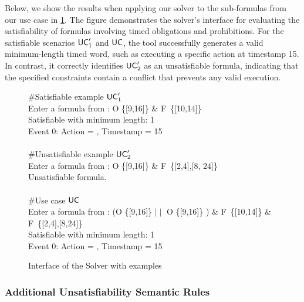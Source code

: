 \begin{example}\label{satsolver}
    Below, we show the results when applying our solver to the  sub-formulas from our use case in \ref{ex:interface}. The figure demonstrates the solver's interface for evaluating the satisfiability of \TDDLfm formulas involving timed obligations and prohibitions. For the satisfiable scenarios $\mathsf{UC}_1'$ and $\mathsf{UC}$, the tool successfully generates a valid minimum-length timed word, such as executing a specific action at timestamp 15. In contrast, it correctly identifies $\mathsf{UC}_2'$ as an unsatisfiable formula, indicating that the specified constraints contain a conflict that prevents any valid execution.
    \begin{figure}[htb]
    \begin{tcolorbox}[colback=blue!10, colframe=gray!80, title=Solver Examples]
    \#Satisfiable example $\mathsf{UC}_1'$\\
        Enter a formula from \TDDLfm: O \delAtGate \{[9,16]\} \& F~\delAtGate \{[10,14]\}\\
        Satisfiable \timedword with minimum length: 1\\
        Event 0: Action = \delAtGate, Timestamp = 15\\
        \\
    \#Unsatisfiable example $\mathsf{UC}_2'$\\
        Enter a formula from \TDDLfm: O \delAtGate \{[9,16]\} \& F~\delAtPark \{[2,4],[8, $24$]\}\\
        Unsatisfiable formula.\\\\
    \#Use case $\mathsf{UC}$\\
     Enter a formula from \TDDLfm: (O \delAtGate \{[9,16]\} $\mid\mid$ O \delAtPark \{[9,16]\} ) \& F~\delAtGate \{[10,14]\} \& F~\delAtGate \{[2,4],[8,24]\}\\
        Satisfiable \timedword with minimum length: 1\\
        Event 0: Action = \delAtGate, Timestamp = 15
    \end{tcolorbox}
    \caption{Interface of the Solver with examples}
    \label{ex:interface}
  \end{figure}
\end{example}

\subsubsection{Additional Unsatisfiability Semantic Rules}

